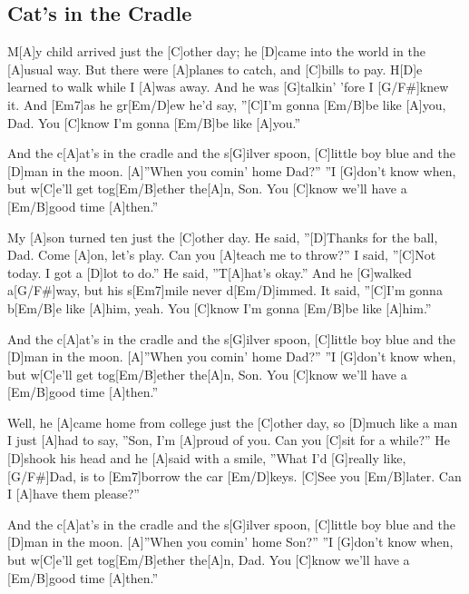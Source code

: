\subsection*{Cat's in the Cradle   }
\begin{guitar}
M[A]y child arrived just the [C]other day;
he [D]came into the world in the [A]usual way.
But there were [A]planes to catch, and [C]bills to pay.
H[D]e learned to walk while I [A]was away.
And he was [G]talkin' 'fore I [G/F#]knew it.  And [Em7]as he gr[Em/D]ew
he'd say, ''[C]I'm gonna [Em/B]be like [A]you, Dad.  You [C]know I'm gonna [Em/B]be like [A]you.''



And the c[A]at's in the cradle and the s[G]ilver spoon,
[C]little boy blue and the [D]man in the moon.
[A]''When you comin' home Dad?''  ''I [G]don't know when,
but w[C]e'll get tog[Em/B]ether the[A]n, Son.  You [C]know we'll have a [Em/B]good time [A]then.''



My [A]son turned ten just the [C]other day.
He said, ''[D]Thanks for the ball, Dad.  Come [A]on, let's play.
Can you [A]teach me to throw?''  I said, ''[C]Not today.
I got a [D]lot to do.''  He said, ''T[A]hat's okay.''
And he [G]walked a[G/F#]way, but his s[Em7]mile never d[Em/D]immed.
It said, ''[C]I'm gonna b[Em/B]e like [A]him, yeah.  You [C]know I'm gonna [Em/B]be like [A]him.''



And the c[A]at's in the cradle and the s[G]ilver spoon,
[C]little boy blue and the [D]man in the moon.
[A]''When you comin' home Dad?''  ''I [G]don't know when,
but w[C]e'll get tog[Em/B]ether the[A]n, Son.  You [C]know we'll have a [Em/B]good time [A]then.''



Well, he [A]came home from college just the [C]other day,
so [D]much like a man I just [A]had to say,
''Son, I'm [A]proud of you.  Can you [C]sit for a while?''
He [D]shook his head and he [A]said with a smile,
''What I'd [G]really like, [G/F#]Dad, is to [Em7]borrow the car [Em/D]keys.
[C]See you [Em/B]later.  Can I [A]have them please?''



And the c[A]at's in the cradle and the s[G]ilver spoon,
[C]little boy blue and the [D]man in the moon.
[A]''When you comin' home Son?''  ''I [G]don't know when,
but w[C]e'll get tog[Em/B]ether the[A]n, Dad.  You [C]know we'll have a [Em/B]good time [A]then.''




\end{guitar}
